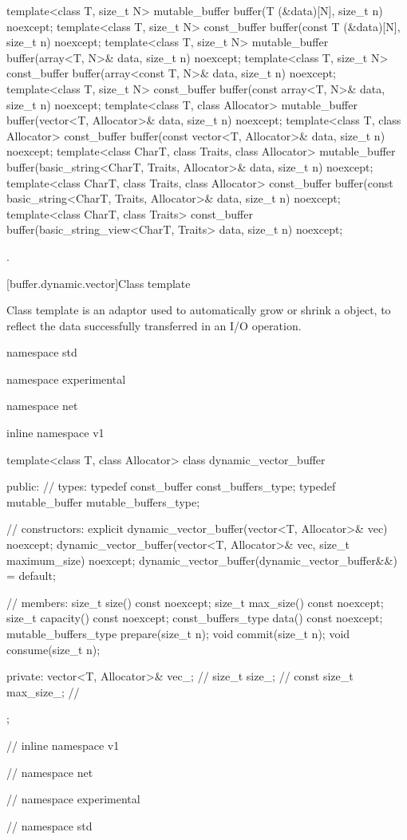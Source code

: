 \begin{itemdecl}
template<class T, size_t N>
  mutable_buffer buffer(T (&data)[N], size_t n) noexcept;
template<class T, size_t N>
  const_buffer buffer(const T (&data)[N], size_t n) noexcept;
template<class T, size_t N>
  mutable_buffer buffer(array<T, N>& data, size_t n) noexcept;
template<class T, size_t N>
  const_buffer buffer(array<const T, N>& data, size_t n) noexcept;
template<class T, size_t N>
  const_buffer buffer(const array<T, N>& data, size_t n) noexcept;
template<class T, class Allocator>
  mutable_buffer buffer(vector<T, Allocator>& data, size_t n) noexcept;
template<class T, class Allocator>
  const_buffer buffer(const vector<T, Allocator>& data, size_t n) noexcept;
template<class CharT, class Traits, class Allocator>
  mutable_buffer buffer(basic_string<CharT, Traits, Allocator>& data,
                        size_t n) noexcept;
template<class CharT, class Traits, class Allocator>
  const_buffer buffer(const basic_string<CharT, Traits, Allocator>& data,
                      size_t n) noexcept;
template<class CharT, class Traits>
  const_buffer buffer(basic_string_view<CharT, Traits> data,
                      size_t n) noexcept;
\end{itemdecl}

\begin{itemdescr}
\pnum
\returns {}.
\end{itemdescr}



[buffer.dynamic.vector]{Class template }

\pnum
Class template  is an adaptor used to automatically grow or shrink a  object, to reflect the data successfully transferred in an I/O operation.

\begin{codeblock}
namespace std {
namespace experimental {
namespace net {
inline namespace v1 {

  template<class T, class Allocator>
  class dynamic_vector_buffer
  {
  public:
    // types:
    typedef const_buffer const_buffers_type;
    typedef mutable_buffer mutable_buffers_type;

    // constructors:
    explicit dynamic_vector_buffer(vector<T, Allocator>& vec) noexcept;
    dynamic_vector_buffer(vector<T, Allocator>& vec,
                          size_t maximum_size) noexcept;
    dynamic_vector_buffer(dynamic_vector_buffer&&) = default;

    // members:
    size_t size() const noexcept;
    size_t max_size() const noexcept;
    size_t capacity() const noexcept;
    const_buffers_type data() const noexcept;
    mutable_buffers_type prepare(size_t n);
    void commit(size_t n);
    void consume(size_t n);

  private:
    vector<T, Allocator>& vec_; // \expos
    size_t size_; // \expos
    const size_t max_size_; // \expos
  };

} // inline namespace v1
} // namespace net
} // namespace experimental
} // namespace std
\end{codeblock}

